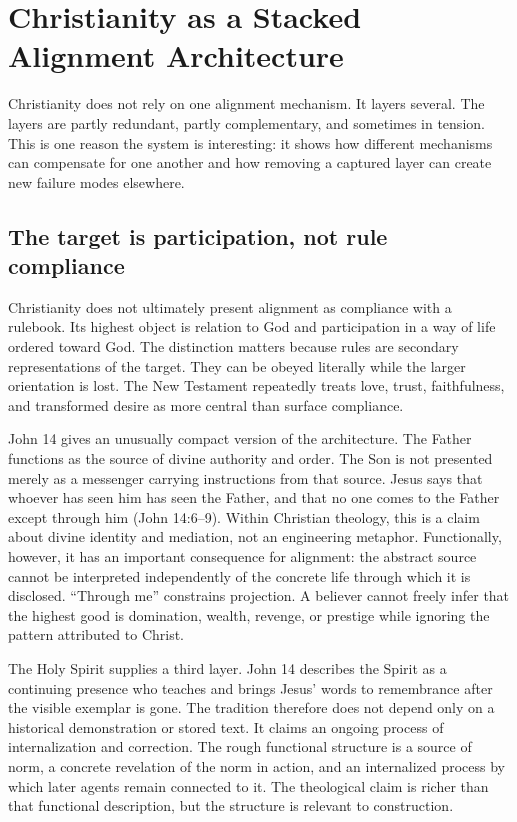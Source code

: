 \documentclass[11pt]{article}
\begin{document}
\section{Christianity as a Stacked Alignment Architecture}

Christianity does not rely on one alignment mechanism. It layers several. The layers are partly redundant, partly complementary, and sometimes in tension. This is one reason the system is interesting: it shows how different mechanisms can compensate for one another and how removing a captured layer can create new failure modes elsewhere.

\subsection{The target is participation, not rule compliance}

Christianity does not ultimately present alignment as compliance with a rulebook. Its highest object is relation to God and participation in a way of life ordered toward God. The distinction matters because rules are secondary representations of the target. They can be obeyed literally while the larger orientation is lost. The New Testament repeatedly treats love, trust, faithfulness, and transformed desire as more central than surface compliance.

John 14 gives an unusually compact version of the architecture. The Father functions as the source of divine authority and order. The Son is not presented merely as a messenger carrying instructions from that source. Jesus says that whoever has seen him has seen the Father, and that no one comes to the Father except through him (John 14:6--9). Within Christian theology, this is a claim about divine identity and mediation, not an engineering metaphor. Functionally, however, it has an important consequence for alignment: the abstract source cannot be interpreted independently of the concrete life through which it is disclosed. ``Through me'' constrains projection. A believer cannot freely infer that the highest good is domination, wealth, revenge, or prestige while ignoring the pattern attributed to Christ.

The Holy Spirit supplies a third layer. John 14 describes the Spirit as a continuing presence who teaches and brings Jesus' words to remembrance after the visible exemplar is gone. The tradition therefore does not depend only on a historical demonstration or stored text. It claims an ongoing process of internalization and correction. The rough functional structure is a source of norm, a concrete revelation of the norm in action, and an internalized process by which later agents remain connected to it. The theological claim is richer than that functional description, but the structure is relevant to construction.
\end{document}
